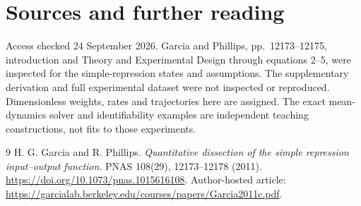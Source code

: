 \chapter*{Sources and further reading}
Access checked 24 September 2026. Garcia and Phillips, pp.~12173--12175,
introduction and Theory and Experimental Design through equations 2--5,
were inspected for the simple-repression states and assumptions.
The supplementary derivation and full experimental dataset were not inspected
or reproduced. Dimensionless weights, rates and trajectories here are assigned.
The exact mean-dynamics solver and identifiability examples are independent
teaching constructions, not fits to those experiments.
\begingroup\let\chapter\section
\begin{thebibliography}{9}
 H. G. Garcia and R. Phillips.
\emph{Quantitative dissection of the simple repression input--output function}.
PNAS 108(29), 12173--12178 (2011).
\url{https://doi.org/10.1073/pnas.1015616108}.
Author-hosted article:
\url{https://garcialab.berkeley.edu/courses/papers/Garcia2011c.pdf}.
\end{thebibliography}\endgroup
